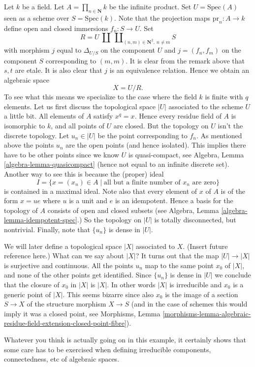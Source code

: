 \begin{example}
\label{example-infinite-product}
Let $k$ be a field.
Let $A = \prod_{n \in \mathbf{N}} k$ be the infinite product.
Set $U = \text{Spec}(A)$ seen as a scheme over $S = \text{Spec}(k)$.
Note that the projection maps $\text{pr}_n : A \to k$ define open
and closed immersions $f_n : S \to U$. Set
$$
R =
U
\ {\textstyle\coprod}
\ \coprod\nolimits_{(n,m) \in \mathbf{N}^2,\ n \not = m} S
$$
with morphism $j$ equal to $\Delta_{U/S}$ on the component $U$
and $j = (f_n, f_m)$ on the component $S$ corresponding to $(m, m)$.
It is clear from the remark above that $s, t$ are etale.
It is also clear that $j$ is an equivalence relation. Hence we
obtain an algebraic space
$$
X = U/R.
$$
To see what this means we specialize to the case where
the field $k$ is finite with $q$ elements. Let us first
discuss the topological space $|U|$ associated to the scheme $U$
a little bit. All elements of $A$ satisfy $x^q = x$.
Hence every residue field of $A$ is isomorphic to $k$, and
all points of $U$ are closed. But the topology on $U$ isn't
the discrete topology. Let $u_n \in |U|$ be the point corresponding
to $f_n$. As mentioned above the points $u_n$ are
the open points (and hence isolated). This implies there have
to be other points since we know $U$ is quasi-compact, see
Algebra, Lemma \ref{algebra-lemma-quasicompact}
(hence not equal to an infinite discrete set).
Another way to see this is because the (proper) ideal
$$
I =
\{x = (x_n) \in A \mid \text{all but a finite number of }x_n\text{ are zero}\}
$$
is contained in a maximal ideal. Note also that every element of
$x$ of $A$ is of the form $x = ue$ where $u$ is a unit and $e$ is an
idempotent. Hence a basis for the topology of $A$ consists of open and
closed subsets (see Algebra, Lemma \ref{algebra-lemma-idempotent-spec}.)
So the topology on $|U|$ is totally disconnected, but nontrivial.
Finally, note that $\{u_n\}$ is dense in $|U|$.

\medskip\noindent
We will later define a topological space $|X|$ associated to $X$.
(Insert future reference here.) What can we say about $|X|$?
It turns out that the map $|U| \to |X|$ is surjective and continuous.
All the points $u_n$ map to the same point $x_0$ of $|X|$, and none of
the other points get identified. Since $\{u_n\}$ is dense in $|U|$ we
conclude that the closure of $x_0$ in $|X|$ is $|X|$. In other words
$|X|$ is irreducible and $x_0$ is a generic point of $|X|$. This seems
bizarre since also $x_0$ is the image of a section
$S \to X$ of the structure morphism $X \to S$ (and in the case of
schemes this would imply it was a closed point, see
Morphisms, Lemma
\ref{morphisms-lemma-algebraic-residue-field-extension-closed-point-fibre}).
\end{example}

\noindent
Whatever you think is actually going on in this example, it certainly
shows that some care has to be exercised when defining irreducible
components, connectedness, etc of algebraic spaces.








